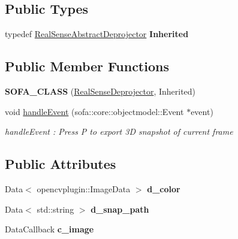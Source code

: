 \subsection*{Public Types}
\begin{DoxyCompactItemize}
\item 
\mbox{\label{classsofa_1_1rgbdtracking_1_1_real_sense_deprojector_a6bae03808ffd8dcb3a90e7ed450cac45}} 
typedef \hyperlink{classsofa_1_1rgbdtracking_1_1_real_sense_abstract_deprojector}{Real\+Sense\+Abstract\+Deprojector} {\bfseries Inherited}
\end{DoxyCompactItemize}
\subsection*{Public Member Functions}
\begin{DoxyCompactItemize}
\item 
\mbox{\label{classsofa_1_1rgbdtracking_1_1_real_sense_deprojector_ab83880605bbf09764e64573381b5502c}} 
{\bfseries S\+O\+F\+A\+\_\+\+C\+L\+A\+SS} (\hyperlink{classsofa_1_1rgbdtracking_1_1_real_sense_deprojector}{Real\+Sense\+Deprojector}, Inherited)
\item 
void \hyperlink{classsofa_1_1rgbdtracking_1_1_real_sense_deprojector_aaa5648b58d79dcabc8265d7eec19b78a}{handle\+Event} (sofa\+::core\+::objectmodel\+::\+Event $\ast$event)
\begin{DoxyCompactList}\small\item\em handle\+Event \+: Press P to export 3D snapshot of current frame \end{DoxyCompactList}\end{DoxyCompactItemize}
\subsection*{Public Attributes}
\begin{DoxyCompactItemize}
\item 
\mbox{\label{classsofa_1_1rgbdtracking_1_1_real_sense_deprojector_a61d80c84f736effdb2ecbd41000b1bea}} 
Data$<$ opencvplugin\+::\+Image\+Data $>$ {\bfseries d\+\_\+color}
\item 
\mbox{\label{classsofa_1_1rgbdtracking_1_1_real_sense_deprojector_ae6f6cf6fff6c3cc81e1370d17b627395}} 
Data$<$ std\+::string $>$ {\bfseries d\+\_\+snap\+\_\+path}
\item 
\mbox{\label{classsofa_1_1rgbdtracking_1_1_real_sense_deprojector_a718873322b7771e3ddf7fa1da705ca6f}} 
Data\+Callback {\bfseries c\+\_\+image}
\end{DoxyCompactItemize}


